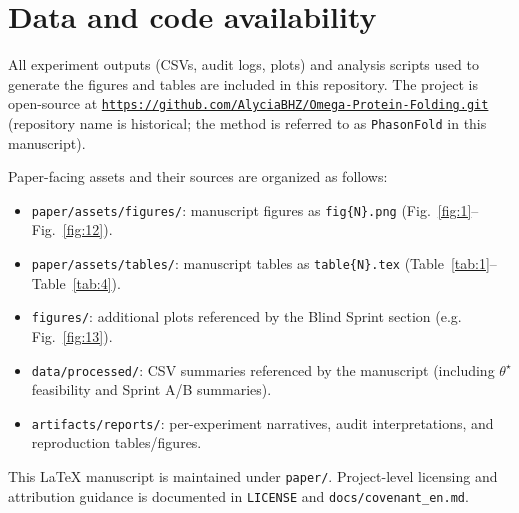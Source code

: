 \section{Data and code availability}

All experiment outputs (CSVs, audit logs, plots) and analysis scripts used to generate the figures and tables are included in this repository. The project is open-source at \href{https://github.com/AlyciaBHZ/Omega-Protein-Folding.git}{\texttt{https://github.com/AlyciaBHZ/Omega-Protein-Folding.git}} (repository name is historical; the method is referred to as \texttt{PhasonFold} in this manuscript).

Paper-facing assets and their sources are organized as follows:
\begin{itemize}
  \item \texttt{paper/assets/figures/}: manuscript figures as \texttt{fig\{N\}.png} (Fig.~\ref{fig:1}--Fig.~\ref{fig:12}).
  \item \texttt{paper/assets/tables/}: manuscript tables as \texttt{table\{N\}.tex} (Table~\ref{tab:1}--Table~\ref{tab:4}).
  \item \texttt{figures/}: additional plots referenced by the Blind Sprint section (e.g. Fig.~\ref{fig:13}).
  \item \texttt{data/processed/}: CSV summaries referenced by the manuscript (including $\theta^\star$ feasibility and Sprint A/B summaries).
  \item \texttt{artifacts/reports/}: per-experiment narratives, audit interpretations, and reproduction tables/figures.
\end{itemize}

This LaTeX manuscript is maintained under \texttt{paper/}. Project-level licensing and attribution guidance is documented in \texttt{LICENSE} and \texttt{docs/covenant\_en.md}.
